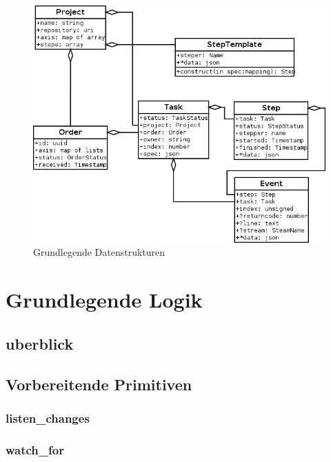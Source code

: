 \begin{figure}[ht] 
  \label{fig:datenstrukturen}
  \begin{center}
      \includegraphics[width=\textwidth]{imageinput/datenstrukturen-step-templates.png}
  \end{center}
  \caption{Grundlegende Datenstrukturen}
\end{figure}



\section{Grundlegende Logik} %


\subsection{uberblick}



\subsection{Vorbereitende Primitiven}

\subsubsection{listen\_changes}
\subsubsection{watch\_for}
